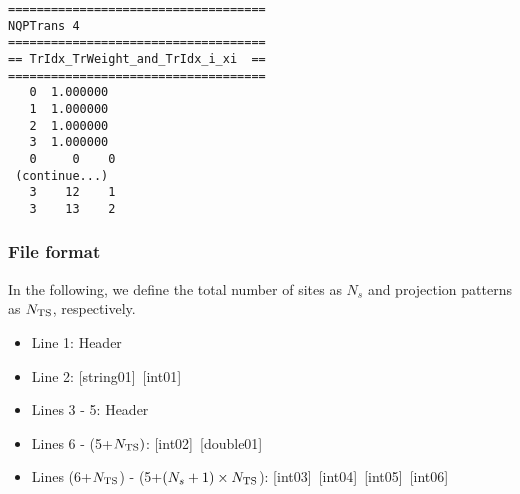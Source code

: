 \begin{minipage}{12.5cm}
\begin{screen}
\begin{verbatim}
====================================
NQPTrans 4  
====================================
== TrIdx_TrWeight_and_TrIdx_i_xi  ==
====================================
   0  1.000000
   1  1.000000
   2  1.000000
   3  1.000000
   0     0    0
 (continue...)
   3    12    1
   3    13    2 
\end{verbatim}
\end{screen}
\end{minipage}

\subsubsection{File format}
In the following, we define the total number of sites as $N_s$ and projection patterns as $N_{\rm TS}$, respectively.  

 \begin{itemize}
   \item  Line 1: Header
   \item  Line 2: [string01]~[int01]
   \item  Lines 3 - 5:  Header
   \item  Lines 6 - (5+$N_{\rm TS})$: [int02]~[double01]
   \item  Lines (6+$N_{\rm TS}$) - (5+$(N_s+1) \times N_{\rm TS}$): [int03]~[int04]~[int05]~[int06]
  \end{itemize}
